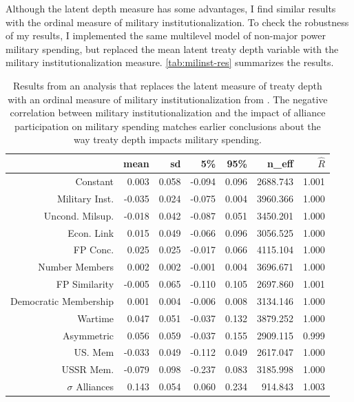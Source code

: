 \documentclass[12pt]{article}
\begin{document}
Although the latent depth measure has some advantages, I find similar results with the ordinal measure of military institutionalization. 
To check the robustness of my results, I implemented the same multilevel model of non-major power military spending, but replaced the mean latent treaty depth variable with the military institutionalization measure. 
\autoref{tab:milinst-res} summarizes the results. 


\begin{table}[ht]
\centering
\begin{tabular}{rrrrrrr}
  \hline
 & mean & sd & 5\% & 95\% & n\_eff & $\hat{R}$ \\ 
  \hline
Constant & 0.003 & 0.058 & -0.094 & 0.096 & 2688.743 & 1.001 \\ 
  Military Inst. & -0.035 & 0.024 & -0.075 & 0.004 & 3960.366 & 1.000 \\ 
  Uncond. Milsup. & -0.018 & 0.042 & -0.087 & 0.051 & 3450.201 & 1.000 \\ 
  Econ. Link & 0.015 & 0.049 & -0.066 & 0.096 & 3056.525 & 1.000 \\ 
  FP Conc. & 0.025 & 0.025 & -0.017 & 0.066 & 4115.104 & 1.000 \\ 
  Number Members & 0.002 & 0.002 & -0.001 & 0.004 & 3696.671 & 1.000 \\ 
  FP Similarity & -0.005 & 0.065 & -0.110 & 0.105 & 2697.860 & 1.001 \\ 
  Democratic Membership & 0.001 & 0.004 & -0.006 & 0.008 & 3134.146 & 1.000 \\ 
  Wartime & 0.047 & 0.051 & -0.037 & 0.132 & 3879.252 & 1.000 \\ 
  Asymmetric & 0.056 & 0.059 & -0.037 & 0.155 & 2909.115 & 0.999 \\ 
  US. Mem & -0.033 & 0.049 & -0.112 & 0.049 & 2617.047 & 1.000 \\ 
  USSR Mem. & -0.079 & 0.098 & -0.237 & 0.083 & 3185.998 & 1.000 \\ 
  $\sigma$ Alliances & 0.143 & 0.054 & 0.060 & 0.234 & 914.843 & 1.003 \\ 
   \hline
\end{tabular}
\caption{Results from an analysis that replaces the latent measure of treaty depth with an ordinal measure of military institutionalization from \citet{LeedsAnac2005}. The negative correlation between military institutionalization and the impact of alliance participation on military spending matches earlier conclusions about the way treaty depth impacts military spending.}
\label{tab:milinst-res}
\end{table}
\end{document}
